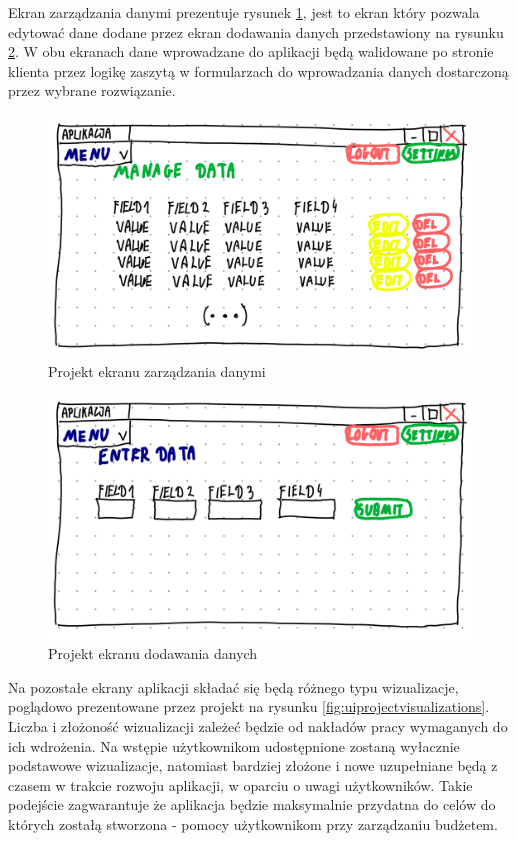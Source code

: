 \documentclass[a4paper,10pt, twoside]{report}
\begin{document}
\begin{large}
{Ekran zarządzania danymi prezentuje rysunek \ref*{fig:uiprojectdatamanagement},
jest to ekran który pozwala edytować dane dodane przez ekran dodawania danych 
przedstawiony na rysunku \ref*{fig:uiprojectadddata}. W obu ekranach dane 
wprowadzane do aplikacji będą walidowane po stronie klienta przez logikę zaszytą
 w formularzach do wprowadzania danych dostarczoną przez wybrane rozwiązanie.}

\begin{figure}[H]           %
    \centering
    \includegraphics[width=12cm]{figures/Righten_UI_sketch_datamanagement.png}
    \caption{Projekt ekranu zarządzania danymi}
    \label{fig:uiprojectdatamanagement}
\end{figure}

\begin{figure}[H]           %
    \centering
    \includegraphics[width=12cm]{figures/Righten_UI_sketch_adddata.png}
    \caption{Projekt ekranu dodawania danych}
    \label{fig:uiprojectadddata}
\end{figure}

{Na pozostałe ekrany aplikacji składać się będą różnego typu wizualizacje, 
poglądowo prezentowane przez projekt na rysunku 
\ref*{fig:uiprojectvisualizations}. Liczba i złożoność wizualizacji zależeć 
będzie od nakładów pracy wymaganych do ich wdrożenia. Na wstępie użytkownikom 
udostępnione zostaną wyłacznie podstawowe wizualizacje, natomiast bardziej 
złożone i nowe uzupełniane będą z czasem w trakcie rozwoju aplikacji, w oparciu 
o uwagi użytkowników. Takie podejście zagwarantuje że aplikacja będzie 
maksymalnie przydatna do celów do których zostałą stworzona - pomocy 
użytkownikom przy zarządzaniu budżetem.}


\end{large}
\end{document}
